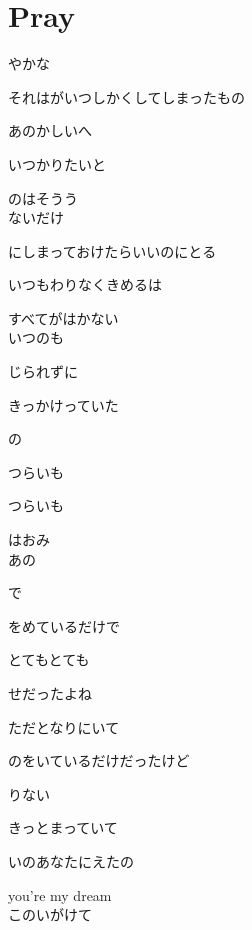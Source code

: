 \section{ Pray}
\large{

やかな

それはがいつしかくしてしまったもの

あのかしいへ

いつかりたいと

のはそうう
\\

ないだけ

にしまっておけたらいいのにとる

いつもわりなくきめるは

すべてがはかない
\\

いつのも

じられずに

きっかけっていた

の

つらいも

つらいも

はおみ
\\

あの

で

をめているだけで

とてもとても

せだったよね

ただとなりにいて

のをいているだけだったけど

りない

きっとまっていて

いのあなたにえたの

you're my dream
\\

このいがけて

}
